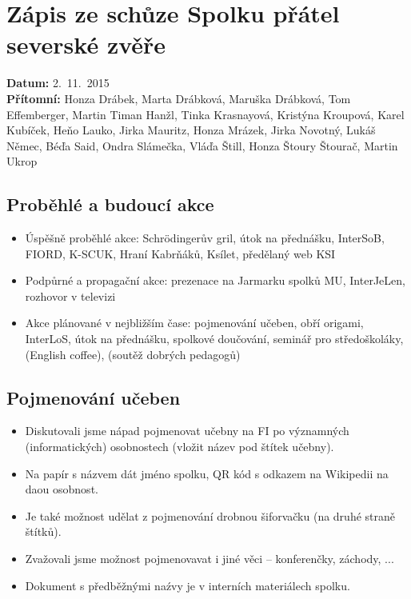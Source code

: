 \documentclass[11pt,a4paper]{article}
\begin{document}
\section*{Zápis ze schůze Spolku přátel severské zvěře}
\textbf{Datum:} 2.~11.~2015\\
\textbf{Přítomní:} Honza Drábek, Marta Drábková, Maruška Drábková, Tom Effemberger, Martin Timan Hanžl, Tinka Krasnayová, Kristýna Kroupová, Karel Kubíček, Heňo Lauko, Jirka Mauritz, Honza Mrázek, Jirka Novotný, Lukáš Němec, Béďa Said, Ondra Slámečka, Vláďa Štill, Honza Štoury Štourač, Martin Ukrop

\subsection*{Proběhlé a budoucí akce}
\begin{itemize}[itemsep=0pt]
\item Úspěšně proběhlé akce: Schrödingerův gril, útok na přednášku, InterSoB, FIORD, K-SCUK, Hraní Kabrňáků, Ksílet, předělaný web KSI
\item Podpůrné a propagační akce: prezenace na Jarmarku spolků MU, InterJeLen, rozhovor v televizi
\item Akce plánované v nejbližším čase: pojmenování učeben, obří origami, InterLoS, útok na přednášku, spolkové doučování, seminář pro středoškoláky, (English coffee), (soutěž dobrých pedagogů)
\end{itemize}

\subsection*{Pojmenování učeben}
\begin{itemize}[itemsep=0pt]
\item Diskutovali jsme nápad pojmenovat učebny na FI po významných (informatických) osobnostech (vložit název pod štítek učebny).
\item Na papír s názvem dát jméno spolku, QR kód s odkazem na Wikipedii na daou osobnost.
\item Je také možnost udělat z pojmenování drobnou šiforvačku (na druhé straně štítků).
\item Zvažovali jsme možnost pojmenovavat i jiné věci -- konferenčky, záchody, ...
\item Dokument s předběžnými naźvy je v interních materiálech spolku.
\end{itemize}
\end{document}

